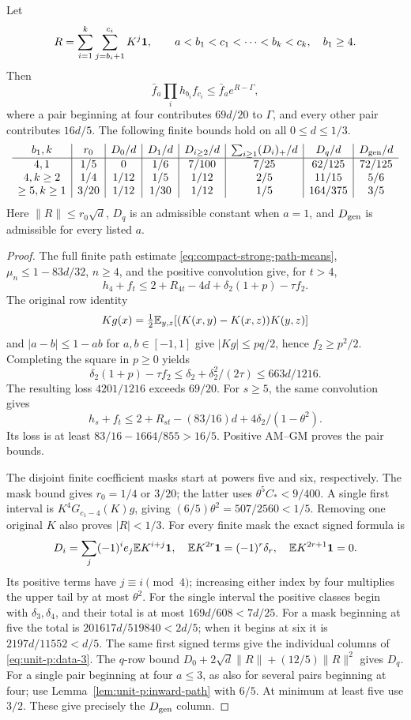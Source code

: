 \begin{lemma}\label{lem:unit-p:minimum-four}
Let
\[
 R=\sum_{i=1}^k\sum_{j=b_i+1}^{c_i}K^j\mathbf1,\qquad
 a<b_1<c_1<\cdots<b_k<c_k,\quad b_1\ge4 .
\]
Then
\[
 \bar f_a\prod_i h_{b_i}f_{c_i}
       \le \bar f_a e^{R-\Gamma},
\]
where a pair beginning at four contributes \(69d/20\) to
\(\Gamma\), and every other pair contributes \(16d/5\).
The following finite bounds hold on all \(0\le d\le1/3\).
\begin{equation}\label{eq:unit-p:data-3}
\begin{array}{c|c|c|c|c|c|c|c}
 b_1,k&r_0&D_0/d&D_1/d&D_{i\ge2}/d&
       \sum_{i\ge1}(D_i)_+/d&D_q/d&D_{\rm gen}/d\\\hline
 4,1&1/5&0&1/6&7/100&7/25&62/125&72/125\\
 4,k\ge2&1/4&1/12&1/5&1/12&2/5&11/15&5/6\\
 \ge5,k\ge1&3/20&1/12&1/30&1/12&1/5&164/375&3/5
\end{array}
\end{equation}
Here \(\|R\|\le r_0\sqrt d\), \(D_q\) is an admissible constant
when \(a=1\), and \(D_{\rm gen}\) is admissible for every listed \(a\).
\end{lemma}
\begin{proof}
The full finite path estimate
\eqref{eq:compact-strong-path-means},
\(\mu_n\le1-83d/32\), \(n\ge4\), and the positive convolution
give, for \(t>4\),
\[
 h_4+f_t\le2+R_{4t}-4d+\delta_2(1+p)-\tau f_2.
\]
The original row identity
\[
 Kg(x)=\tfrac12\mathbb E_{y,z}
 [(K(x,y)-K(x,z))K(y,z)]
\]
and \(|a-b|\le1-ab\) for \(a,b\in[-1,1]\) give
\(|Kg|\le pq/2\), hence \(f_2\ge p^2/2\).
Completing the square in \(p\ge0\) yields
\[
 \delta_2(1+p)-\tau f_2
 \le\delta_2+\delta_2^2/(2\tau)\le663d/1216 .
\]
The resulting loss \(4201/1216\) exceeds \(69/20\).
For \(s\ge5\), the same convolution gives
\[
 h_s+f_t\le2+R_{st}-(83/16)d+
                         4\delta_2/(1-\theta^2).
\]
Its loss is at least \(83/16-1664/855>16/5\).
Positive AM--GM proves the pair bounds.

The disjoint finite coefficient masks start at powers five and six,
respectively. The mask bound gives \(r_0=1/4\) or \(3/20\);
the latter uses \(\theta^5C_*<9/400\).
A single first interval is \(K^4G_{c_1-4}(K)g\), giving
\((6/5)\theta^2=507/2560<1/5\).
Removing one original \(K\) also proves \(|R|<1/3\).
For every finite mask the exact signed formula is
\[
 D_i=\sum_j(-1)^ie_j\mathbb E K^{i+j}\mathbf1,\quad
 \mathbb E K^{2r}\mathbf1=(-1)^r\delta_r,\quad
 \mathbb E K^{2r+1}\mathbf1=0 .
\]
Its positive terms have \(j\equiv i\pmod4\); increasing either
index by four multiplies the upper tail by at most \(\theta^2\).
For the single interval the positive classes begin with
\(\delta_3,\delta_4\), and their total is at most \(169d/608<7d/25\).
For a mask beginning at five the total is
\(201617d/519840<2d/5\); when it begins at six it is
\(2197d/11552<d/5\). The same first signed terms give the
individual columns of \eqref{eq:unit-p:data-3}.
The \(q\)-row bound
\(D_0+2\sqrt d\|R\|+(12/5)\|R\|^2\) gives \(D_q\).
For a single pair beginning at four \(a\le3\), as also for
several pairs beginning at four; use Lemma~\ref{lem:unit-p:inward-path}
with \(6/5\). At minimum at least five use \(3/2\).
These give precisely the \(D_{\rm gen}\) column.
\end{proof}

